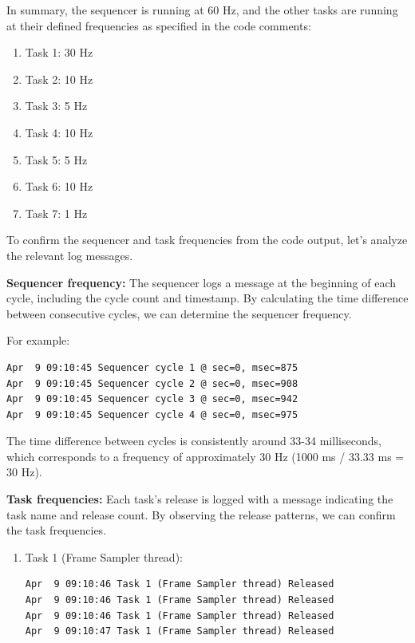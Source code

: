 \documentclass[a4paper,11pt]{article}%
\newenvironment{qanda}{\setlength{\parindent}{0pt}}{\bigskip}
\begin{document}
\begin{qanda}
\begin{enumerate}
			In summary, the sequencer is running at 60 Hz, and the other tasks are running at their defined frequencies as specified in the code comments:\\
			\begin{enumerate}
				\item Task 1: 30 Hz
				\item Task 2: 10 Hz
				\item Task 3: 5 Hz
				\item Task 4: 10 Hz
				\item Task 5: 5 Hz
				\item Task 6: 10 Hz
				\item Task 7: 1 Hz
			\end{enumerate}





			To confirm the sequencer and task frequencies from the code output, let's analyze the relevant log messages.

			\textbf{Sequencer frequency:}
			The sequencer logs a message at the beginning of each cycle, including the cycle count and timestamp. By calculating the time difference between consecutive cycles, we can determine the sequencer frequency.

			For example:

			\begin{lstlisting}
Apr  9 09:10:45 Sequencer cycle 1 @ sec=0, msec=875
Apr  9 09:10:45 Sequencer cycle 2 @ sec=0, msec=908
Apr  9 09:10:45 Sequencer cycle 3 @ sec=0, msec=942
Apr  9 09:10:45 Sequencer cycle 4 @ sec=0, msec=975
\end{lstlisting}

			The time difference between cycles is consistently around 33-34 milliseconds, which corresponds to a frequency of approximately 30 Hz (1000 ms / 33.33 ms = 30 Hz).

			\textbf{Task frequencies:}
			Each task's release is logged with a message indicating the task name and release count. By observing the release patterns, we can confirm the task frequencies.
			\begin{enumerate}
				\item Task 1 (Frame Sampler thread):

				      \begin{lstlisting}
Apr  9 09:10:46 Task 1 (Frame Sampler thread) Released
Apr  9 09:10:46 Task 1 (Frame Sampler thread) Released
Apr  9 09:10:46 Task 1 (Frame Sampler thread) Released
Apr  9 09:10:47 Task 1 (Frame Sampler thread) Released
				\end{lstlisting}


\end{enumerate}
\end{enumerate}
\end{qanda}
\end{document}
